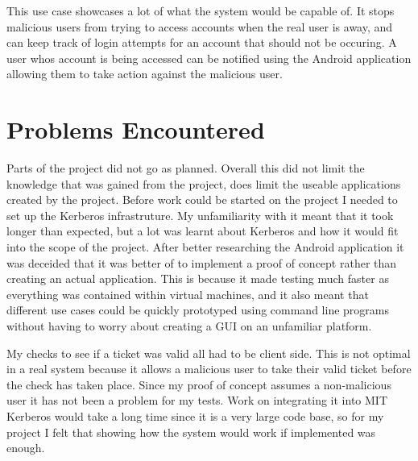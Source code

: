 \documentclass[]{report}   %
\begin{document}
This use case showcases a lot of what the system would be capable of. It stops malicious users from trying to access accounts when the real user is away, and can keep track of login attempts for an account that should not be occuring. A user whos account is being accessed can be notified using the Android application allowing them to take action against the malicious user.


\section{Problems Encountered}
Parts of the project did not go as planned. Overall this did not limit the knowledge that was gained from the project, does limit the useable applications created by the project. Before work could be started on the project I needed to set up the Kerberos infrastruture. My unfamiliarity with it meant that it took longer than expected, but a lot was learnt about Kerberos and how it would fit into the scope of the project. After better researching the Android application it was deceided that it was better of to implement a proof of concept rather than creating an actual application. This is because it made testing much faster as everything was contained within virtual machines, and it also meant that different use cases could be quickly prototyped using command line programs without having to worry about creating a GUI on an unfamiliar platform.

My checks to see if a ticket was valid all had to be client side. This is not optimal in a real system because it allows a malicious user to take their valid ticket before the check has taken place. Since my proof of concept assumes a non-malicious user it has not been a problem for my tests. Work on integrating it into MIT Kerberos would take a long time since it is a very large code base, so for my project I felt that showing how the system would work if implemented was enough.




\end{document}
